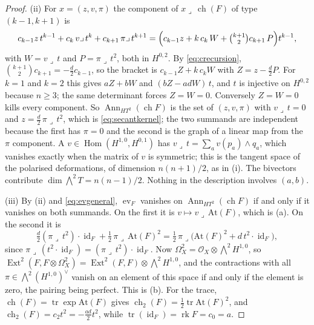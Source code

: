 \documentclass[11pt,reqno]{amsart}
\theoremstyle{plain}
\theoremstyle{definition}
\theoremstyle{remark}
\newcommand{\cO}{\mathcal{O}}
\DeclareMathOperator{\ch}{ch}
\DeclareMathOperator{\rk}{rk}
\DeclareMathOperator{\Hom}{Hom}
\DeclareMathOperator{\Ext}{Ext}
\DeclareMathOperator{\id}{id}
\DeclareMathOperator{\Ann}{Ann}
\begin{document}
\begin{proof}
(ii) For $x=(z,v,\pi)$ the component of $x\lrcorner\,\ch(F)$ of type
$(k-1,k+1)$ is
\[
  c_{k-1}z\,t^{k-1}+c_{k}\,v\lrcorner\,t^{k}+c_{k+1}\,\pi\lrcorner\,t^{k+1}
  =\Bigl(c_{k-1}z+k\,c_{k}\,W+\tbinom{k+1}{2}c_{k+1}\,P\Bigr)t^{k-1},
\]
with $W=v\lrcorner\,t$ and $P=\pi\lrcorner\,t^{2}$, both in $H^{0,2}$. By
\eqref{eq:crecursion}, $\binom{k+1}{2}c_{k+1}=-\tfrac d2c_{k-1}$, so the bracket
is $c_{k-1}Z+k\,c_{k}W$ with $Z=z-\tfrac d2P$. For $k=1$ and $k=2$ this gives
$aZ+bW$ and $(bZ-adW)\,t$, and $t$ is injective on $H^{0,2}$ because $n\ge3$;
the same determinant forces $Z=W=0$. Conversely $Z=W=0$ kills every
component. So $\Ann_{HT^{2}}(\ch F)$ is the set of $(z,v,\pi)$ with
$v\lrcorner\,t=0$ and $z=\tfrac d2\,\pi\lrcorner\,t^{2}$, which is
\eqref{eq:secantkernel}; the two summands are independent because the first
has $\pi=0$ and the second is the graph of a linear map from the $\pi$
component. A $v\in\Hom(H^{1,0},H^{0,1})$ has $v\lrcorner\,t=\sum_{a}v(p_{a})\wedge q_{a}$,
which vanishes exactly when the matrix of $v$ is symmetric; this is the
tangent space of the polarised deformations, of dimension $n(n+1)/2$, as in
(i). The bivectors contribute
$\dim\bigwedge^{2}T=n(n-1)/2$. Nothing in the description involves $(a,b)$.

(iii) By (ii) and \eqref{eq:evgeneral}, $\operatorname{ev}_{F}$ vanishes on
$\Ann_{HT^{2}}(\ch F)$ if and only if it vanishes on both summands. On the
first it is $v\mapsto v\lrcorner\,\mathrm{At}(F)$, which is (a). On the
second it is
\[
  \tfrac d2(\pi\lrcorner\,t^{2})\cdot\id_{F}+\tfrac12\,\pi\lrcorner\,\mathrm{At}(F)^{2}
  =\tfrac12\,\pi\lrcorner\bigl(\mathrm{At}(F)^{2}+d\,t^{2}\cdot\id_{F}\bigr),
\]
since $\pi\lrcorner\,(t^{2}\cdot\id_{F})=(\pi\lrcorner\,t^{2})\cdot\id_{F}$.
Now $\Omega^{2}_{X}=\cO_{X}\otimes\bigwedge^{2}H^{1,0}$, so
$\Ext^{2}(F,F\otimes\Omega^{2}_{X})=\Ext^{2}(F,F)\otimes\bigwedge^{2}H^{1,0}$,
and the contractions with all $\pi\in\bigwedge^{2}(H^{1,0})^{\vee}$ vanish on
an element of this space if and only if the element is zero, the pairing
being perfect. This is (b). For the trace, $\ch(F)=\operatorname{tr}\exp\mathrm{At}(F)$
gives $\ch_{2}(F)=\tfrac12\operatorname{tr}\mathrm{At}(F)^{2}$, and
$\ch_{2}(F)=c_{2}t^{2}=-\tfrac{ad}{2}t^{2}$, while
$\operatorname{tr}(\id_{F})=\rk F=c_{0}=a$.


\end{proof}
\end{document}
